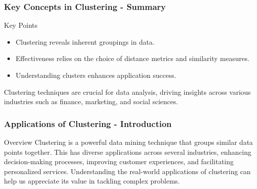 \documentclass[aspectratio=169]{beamer}
\begin{document}
\begin{frame}[fragile]
    \frametitle{Key Concepts in Clustering - Summary}
    \begin{block}{Key Points}
        \begin{itemize}
            \item Clustering reveals inherent groupings in data.
            \item Effectiveness relies on the choice of distance metrics and similarity measures.
            \item Understanding clusters enhances application success.
        \end{itemize}
    \end{block}
    Clustering techniques are crucial for data analysis, driving insights across various industries such as finance, marketing, and social sciences.
\end{frame}

\begin{frame}[fragile]
    \frametitle{Applications of Clustering - Introduction}
    \begin{block}{Overview}
        Clustering is a powerful data mining technique that groups similar data points together. This has diverse applications across several industries, enhancing decision-making processes, improving customer experiences, and facilitating personalized services. Understanding the real-world applications of clustering can help us appreciate its value in tackling complex problems.
    \end{block}
\end{frame}
\end{document}
